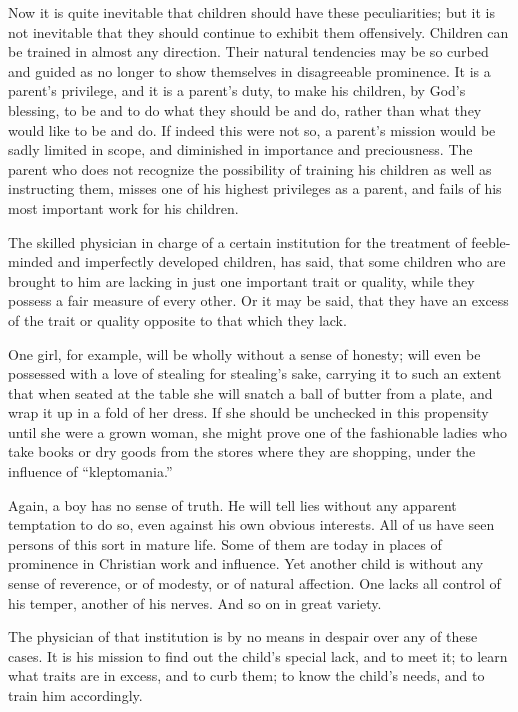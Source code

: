 \documentclass[
]{book}
\begin{document}
Now it is quite inevitable that children should have these peculiarities; but it is not inevitable that they should continue to exhibit them offensively. Children can be trained in almost any direction. Their natural tendencies may be so curbed and guided as no longer to show themselves in disagreeable prominence. It is a parent's privilege, and it is a parent's duty, to make his children, by God's blessing, to be and to do what they should be and do, rather than what they would like to be and do. If indeed this were not so, a parent's mission would be sadly limited in scope, and diminished in importance and preciousness. The parent who does not recognize the possibility of training his children as well as instructing them, misses one of his highest privileges as a parent, and fails of his most important work for his children.

The skilled physician in charge of a certain institution for the treatment of feeble-minded and imperfectly developed children, has said, that some children who are brought to him are lacking in just one important trait or quality, while they possess a fair measure of every other. Or it may be said, that they have an excess of the trait or quality opposite to that which they lack.

One girl, for example, will be wholly without a sense of honesty; will even be possessed with a love of stealing for stealing's sake, carrying it to such an extent that when seated at the table she will snatch a ball of butter from a plate, and wrap it up in a fold of her dress. If she should be unchecked in this propensity until she were a grown woman, she might prove one of the fashionable ladies who take books or dry goods from the stores where they are shopping, under the influence of ``kleptomania.''

Again, a boy has no sense of truth. He will tell lies without any apparent temptation to do so, even against his own obvious interests. All of us have seen persons of this sort in mature life. Some of them are today in places of prominence in Christian work and influence. Yet another child is without any sense of reverence, or of modesty, or of natural affection. One lacks all control of his temper, another of his nerves. And so on in great variety.

The physician of that institution is by no means in despair over any of these cases. It is his mission to find out the child's special lack, and to meet it; to learn what traits are in excess, and to curb them; to know the child's needs, and to train him accordingly.
\end{document}
